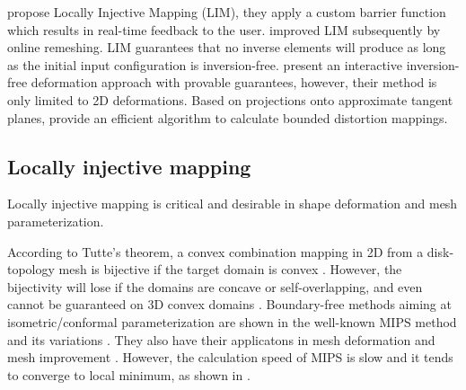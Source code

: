 \cite{schuller2013locally} propose Locally Injective Mapping (LIM), they apply a custom barrier function which results in real-time feedback to the user. \cite{jin2014remeshing} improved LIM subsequently by online remeshing.  LIM guarantees that no inverse elements will produce as long as the initial input configuration is inversion-free. \cite{poranne2014provably} present an interactive inversion-free deformation approach with provable guarantees, however, their method is only limited to 2D deformations. Based on projections onto approximate tangent planes, \cite{kovalsky2015large} provide an efficient algorithm to calculate bounded distortion mappings.

\subsection{Locally injective mapping}
Locally injective mapping is critical and desirable in shape deformation and mesh parameterization.


According to Tutte's theorem, a convex combination mapping in 2D from a disk-topology mesh is bijective if the target domain is convex \citep{tutte1963draw,floater2003one}. However, the bijectivity will lose if the domains are concave or self-overlapping, and even cannot be guaranteed on 3D convex domains \citep{floater2006convex}. Boundary-free methods aiming at isometric/conformal parameterization are shown in the well-known MIPS method \citep{hormann2000mips} and its variations \citep{sander2001texture,degener2003adaptable}. They also have their applicatons in mesh deformation \citep{eigensatz2009positional} and mesh improvement \citep{freitag2002tetrahedral,jiao2011simple}. However, the calculation speed of MIPS is slow and it tends to converge to local minimum, as shown in \citep{sheffer2007mesh}.



